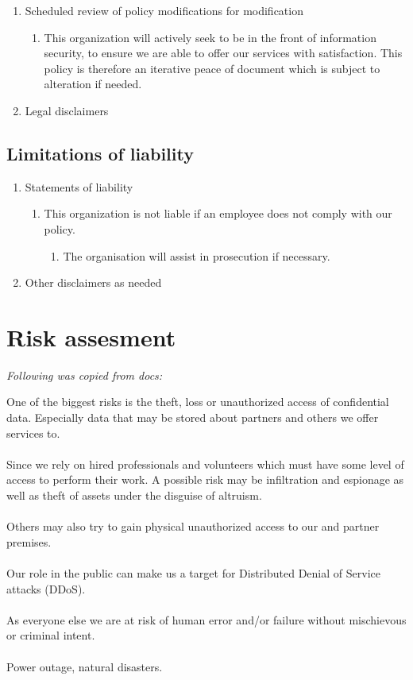 \begin{enumerate}
  \item Scheduled review of policy modifications for modification
  \begin{enumerate}
    \item This organization will actively seek to be in the front of information security, to ensure we are able to offer our services with satisfaction. This policy is therefore an iterative peace of document which is subject to alteration if needed.
  \end{enumerate}
  \item Legal disclaimers
\end{enumerate}

\subsection{Limitations of liability}

\begin{enumerate}
  \item Statements of liability
  \begin{enumerate}
    \item This organization is not liable if an employee does not comply with our policy.
    \begin{enumerate}
      \item The organisation will assist in prosecution if necessary.
    \end{enumerate}
  \end{enumerate}
  \item Other disclaimers as needed
\end{enumerate}


\clearpage

\section{Risk assesment}

\textit{Following was copied from docs:}

One of the biggest risks is the theft, loss or unauthorized access of confidential data. Especially data that may be stored about partners and others we offer services to.
\\
\\
Since we rely on hired professionals and volunteers which must have some level of access to perform their work. A possible risk may be infiltration and espionage as well as theft of assets under the disguise of altruism.
\\
\\
Others may also try to gain physical unauthorized access to our and partner premises.
\\
\\
Our role in the public can make us a target for Distributed Denial of Service attacks (DDoS).
\\
\\
As everyone else we are at risk of human error and/or failure without mischievous or criminal intent. 
\\
\\
Power outage, natural disasters.

